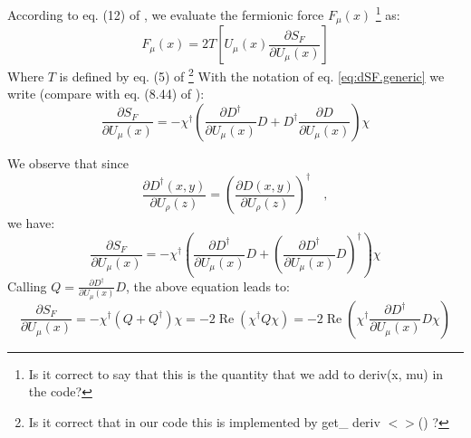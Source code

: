 \documentclass[12pt, a4paper]{article}
\begin{document}
According to eq. (12) of \cite{BITAR1989377}, we evaluate the fermionic force $F_{\mu}(x)$ 
\footnote{
Is it correct to say that this is the quantity that we add to deriv(x, mu) in the code?
}
as:
%
\begin{equation}
F_{\mu}(x) = 
2 T
\left[ 
U_{\mu}(x) \frac{\partial S_F}{\partial U_{\mu}(x)} 
\right]
\end{equation}
%
Where $T$ is defined by eq. (5) of \cite{BITAR1989377}
\footnote{Is it correct that in our code this is implemented by get\_ deriv $<>$() ?}
%
With the notation of eq. \eqref{eq:dSF.generic} we write 
(compare with eq. (8.44) of \cite{gattringer2009quantum}):
%
\begin{equation}
\frac{\partial S_F}{\partial U_{\mu}(x)}
= 
- \chi^{\dagger}
\left( 
\frac{\partial D^{\dagger}}{\partial U_{\mu}(x)} D
+
D^{\dagger} \frac{\partial D}{\partial U_{\mu}(x)}
\right) 
\chi
\end{equation}

We observe that since
%
\begin{equation}
\frac{\partial D^{\dagger}(x,y)}{\partial U_{\rho}(z)} =
\left(
\frac{\partial D(x,y)}{\partial U_{\rho}(z)}
\right)^{\dagger}
\quad ,
\end{equation}
%
we have:
%
\begin{equation}
\frac{\partial S_F}{\partial U_{\mu}(x)}
= 
- \chi^{\dagger}
\left( 
\frac{\partial D^{\dagger}}{\partial U_{\mu}(x)} 
D
+
\left(
\frac{\partial D^{\dagger}}{\partial U_{\mu}(x)}
D
\right)^\dagger
\right) 
\chi
\end{equation}
%
Calling $Q = \frac{\partial D^{\dagger}}{\partial U_{\mu}(x)}
D$, the above equation leads to:
%
\begin{equation}
\frac{\partial S_F}{\partial U_{\mu}(x)}
= - \chi^{\dagger}( Q + Q^\dagger ) \chi 
= - 2 \operatorname{Re} \left( \chi^{\dagger} Q  \chi \right)
= - 2 \operatorname{Re} \left( \chi^{\dagger}  \frac{\partial D^{\dagger}}{\partial U_{\mu}(x)} D  \chi \right)
\end{equation}
%








\printbibliography
\end{document}
